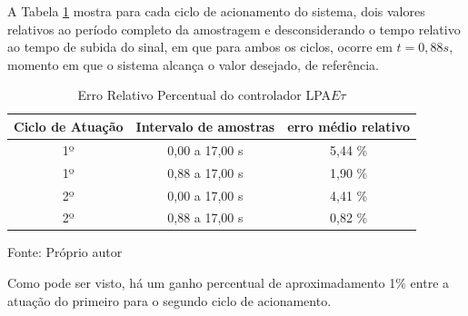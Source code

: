 A Tabela \ref{tab:ErroLPAEt} mostra para cada ciclo de 
acionamento do sistema, 
dois valores relativos ao período completo da amostragem e
desconsiderando o tempo relativo ao tempo de subida do sinal,
em que para ambos os ciclos, ocorre em $t = 0,88 s$, 
momento em que o sistema alcança o valor desejado, 
de referência.


\begin{table}[h]%
\centering
\caption{Erro Relativo Percentual do controlador LPA$E\tau$}
\label{tab:ErroLPAEt}

\begin{tabular}{c|c|c}
\hline
Ciclo de Atuação & Intervalo de amostras  &  erro médio relativo \\ \hline
\hline
1º & 0,00 a 17,00 s &  5,44 \% \\ \hline
1º & 0,88 a 17,00 s &  1,90 \% \\ \hline
2º & 0,00 a 17,00 s &  4,41 \% \\ \hline
2º & 0,88 a 17,00 s &  0,82 \% \\ \hline
\end{tabular}

{\vspace{0.2cm} \small Fonte: Próprio autor}
\end{table}

Como pode ser visto, há um ganho percentual de 
aproximadamento 1\% entre a atuação do primeiro 
para o segundo ciclo de acionamento. 


